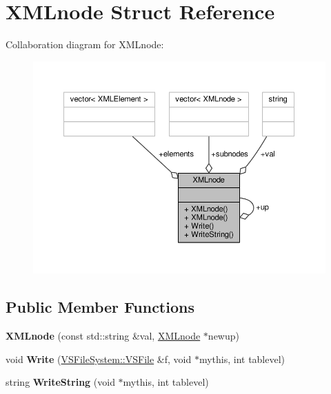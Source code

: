 \hypertarget{structXMLnode}{}\section{X\+M\+Lnode Struct Reference}
\label{structXMLnode}


Collaboration diagram for X\+M\+Lnode\+:
\nopagebreak
\begin{figure}[H]
\begin{center}
\leavevmode
\includegraphics[width=350pt]{d7/d4c/structXMLnode__coll__graph}
\end{center}
\end{figure}
\subsection*{Public Member Functions}
\begin{DoxyCompactItemize}
\item 
{\bfseries X\+M\+Lnode} (const std\+::string \&val, \hyperlink{structXMLnode}{X\+M\+Lnode} $\ast$newup)\hypertarget{structXMLnode_afc3de966116a3172c36e1c493c39b02b}{}\label{structXMLnode_afc3de966116a3172c36e1c493c39b02b}

\item 
void {\bfseries Write} (\hyperlink{classVSFileSystem_1_1VSFile}{V\+S\+File\+System\+::\+V\+S\+File} \&f, void $\ast$mythis, int tablevel)\hypertarget{structXMLnode_aa021dfe420a0084946592ceb94b92680}{}\label{structXMLnode_aa021dfe420a0084946592ceb94b92680}

\item 
string {\bfseries Write\+String} (void $\ast$mythis, int tablevel)\hypertarget{structXMLnode_a5406bd9ca5ecccf4d0bc1693ea0a3704}{}\label{structXMLnode_a5406bd9ca5ecccf4d0bc1693ea0a3704}

\end{DoxyCompactItemize}
